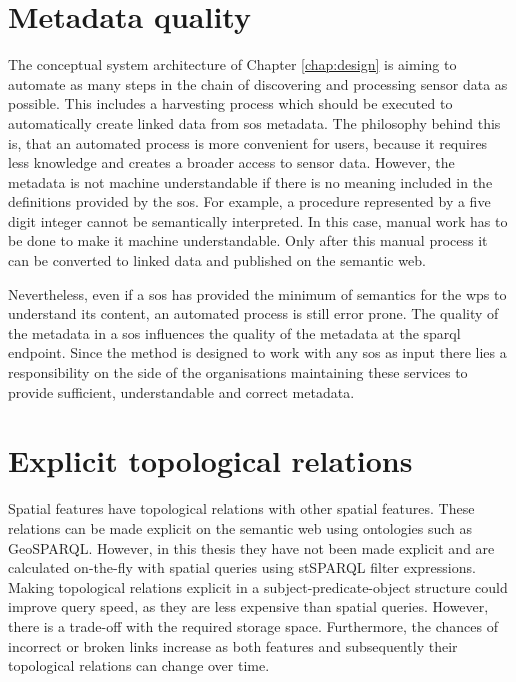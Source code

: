 \section{Metadata quality}
\label{metaqua}
The conceptual system architecture of Chapter \ref{chap:design} is aiming to automate as many steps in the chain of discovering and processing sensor data as possible. This includes a harvesting process which should be executed to automatically create linked data from \ac{sos} metadata. The philosophy behind this is, that an automated process is more convenient for users, because it requires less knowledge and creates a broader access to sensor data. However, the metadata is not machine understandable if there is no meaning included in the definitions provided by the \ac{sos}. For example, a procedure represented by a five digit integer cannot be semantically interpreted. In this case, manual work has to be done to make it machine understandable. Only after this manual process it can be converted to linked data and published on the semantic web. 

Nevertheless, even if a \ac{sos} has provided the minimum of semantics for the \ac{wps} to understand its content, an automated process is still error prone. The quality of the metadata in a \ac{sos} influences the quality of the metadata at the \ac{sparql} endpoint. Since the method is designed to work with any \ac{sos} as input there lies a responsibility on the side of the organisations maintaining these services to provide sufficient, understandable and correct metadata.   

 

\section{Explicit topological relations}
\label{expltr}
Spatial features have topological relations with other spatial features. These relations can be made explicit on the semantic web using ontologies such as GeoSPARQL. However, in this thesis they have not been made explicit and are calculated on-the-fly with spatial queries using stSPARQL filter expressions. Making topological relations explicit in a subject-predicate-object structure could improve query speed, as they are less expensive than spatial queries. However, there is a trade-off with the required storage space. Furthermore, the chances of incorrect or broken links increase as both features and subsequently their topological relations can change over time. 

